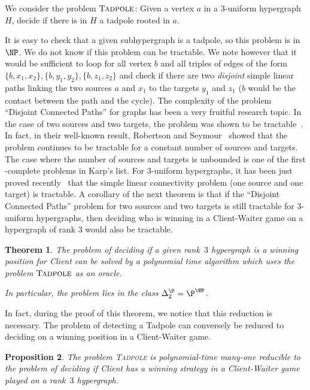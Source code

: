 \documentclass{article}
\newtheorem{theorem}{Theorem}
\newtheorem{proposition}[theorem]{Proposition}
\begin{document}
We consider the problem \(\textsc{Tadpole}\):  Given a vertex \(a\) in a \(3\)-uniform hypergraph \(H\), decide if there is in \(H\) a tadpole rooted in \(a\).

It is easy to check that a given subhypergraph is a tadpole, so this problem is in \(\NP\). We do not know if this problem can be tractable. We note however that it would be sufficient to loop for all vertex \(b\) and all triples of edges of the form \(\{b,x_1,x_2\},\{b,y_1,y_2\},\{b,z_1,z_2\}\) and check if there are two {\em disjoint} simple linear paths linking the two sources \(a\) and \(x_1\) to the targets \(y_1\) and \(z_1\) (\(b\) would be the contact between the path and the cycle). The complexity of the problem ``Disjoint Connected Paths'' for graphs has been a very fruitful research topic. In the case of two sources and two targets, the problem was shown to be tractable~\cite{Shi80,Sey80}. In fact, in their well-known result, Robertson and Seymour~\cite{RS95} showed that the problem continues to be tractable for a constant number of sources and targets. The case where the number of sources and targets is unbounded is one of the first \NP-complete problems in Karp's list. For \(3\)-uniform hypergraphs, it has been just proved recently~\cite{GGS23} that the simple linear connectivity problem (one source and one target) is tractable. A corollary of the next theorem is that if the ``Disjoint Connected Paths'' problem for two sources and two targets is still tractable for \(3\)-uniform hypergraphs, then deciding who is winning in a Client-Waiter game on a hypergraph of rank \(3\) would also be tractable.


\begin{theorem}\label{thm: rank3 client-waiter}
	The problem of deciding if a given rank~\(3\) hypergraph is a winning position for Client can be solved by a polynomial time algorithm which uses the problem \(\textsc{Tadpole}\) as an oracle.
	
	In particular, the problem lies in the class $\Delta_2^{\P} = \P^{\NP}$.
\end{theorem}

In fact, during the proof of this theorem, we notice that this reduction is necessary. The problem of detecting a Tadpole can conversely be reduced to deciding on a winning position in a Client-Waiter game.

\begin{proposition}\label{prop:HarderThanTadpole}
	The problem \textsc{Tadpole} is polynomial-time many-one reducible to the problem of deciding if Client has a winning strategy in a Client-Waiter game played on a rank~$3$ hypergraph.
\end{proposition}
\end{document}
